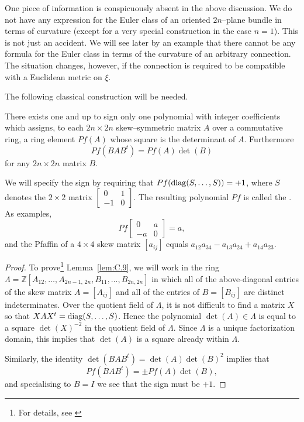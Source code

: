 \documentclass[../main]{subfiles}
\begin{document}
One piece of information is conspicuously absent in the above discussion. We do not have any expression for the Euler class of an oriented $2n$--plane bundle in terms of curvature (except for a very special construction in the case $n=1$). This is not just an accident. We will see later by an example that there cannot be any formula for the Euler class in terms of the curvature of an arbitrary connection. The situation changes, however, if the connection is required to be compatible with a Euclidean metric on $\xi$.

The following classical construction will be needed. 

\begin{lemma}
\label{lem:C.9}
There exists one and up to sign only one polynomial with integer coefficients which assigns, to each $2n \times 2n$ skew--symmetric matrix $A$ over a commutative ring, a ring element $P f(A)$ whose square is the determinant of $A$. Furthermore \[Pf(BAB^t) = Pf(A) \det(B)\] for any $2n \times 2n$ matrix $B$. 
\end{lemma}

We will specify the sign by requiring that $Pf(\operatorname{diag}(S, \ldots, S)) = +1$, where $S$ denotes the $2 \times 2$ matrix $\begin{bmatrix}0 & 1 \\ -1 & 0\end{bmatrix}$. The resulting polynomial $P f$ is called the . As examples, \[Pf \begin{bmatrix}0 & a \\ -a & 0\end{bmatrix} = a,\] and the Pfaffin of a $4 \times 4$ skew matrix $[a_{ij}]$ equals $a_{12} a_{34} - a_{13} a_{24} + a_{14} a_{23}$.

\begin{proof}
To prove\footnote{For details, see \cite[chapter 9, p. 82]{bourbaki1959algebre9}} Lemma~\ref{lem:C.9}, we will work in the ring\newline $\Lambda = \mathbb Z[A_{12}, \ldots, A_{2n-1,\,2n}, B_{11}, \ldots, B_{2n, 2n}]$ in which all of the above-diagonal entries of the skew matrix $A = [A_{ij}]$ and all of the entries of $B = [B_{ij}]$ are distinct indeterminates. Over the quotient field of $\Lambda$, it is not difficult to find a matrix $X$ so that $X A X^t = \operatorname{diag}(S, \ldots, S)$. Hence the polynomial $\det(A) \in \Lambda$ is equal to a square $\det(X)^{-2}$ in the quotient field of $\Lambda$. Since $\Lambda$ is a unique factorization domain, this implies that $\det(A)$ is a square already within $\Lambda$. 

Similarly, the identity $\det(BAB^t) = \det(A) \det(B)^2$ implies that \[Pf(BAB^t) = \pm Pf(A) \det(B),\] and specialising to $B = I$ we see that the sign must be $+1$. 
\end{proof}
\end{document}
